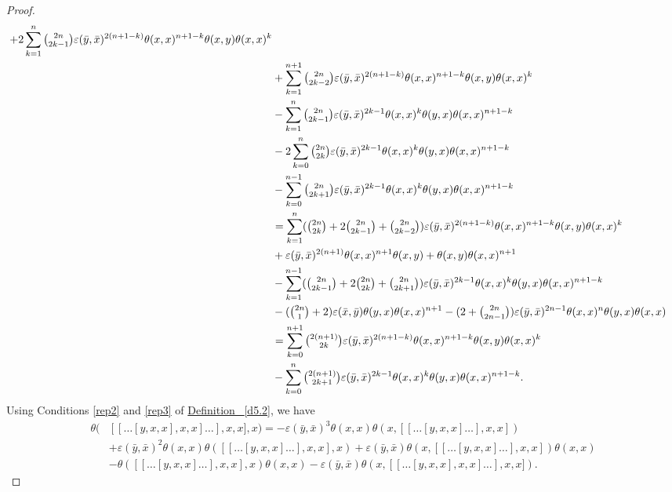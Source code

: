 \documentclass[11pt, twoside]{article}
\begin{document}
\begin{proof}
\begin{align*}
     + 2 \sum\limits_{k=1}^{n}\tbinom{2n}{2k-1}\varepsilon(\bar{y},\bar{x})^{2(n+1-k)}\theta(x,x)^{n+1-k}\theta(x,y)\theta(x,x)^{k} \\ & +\sum\limits_{k=1}^{n+1}\tbinom{2n}{2k-2}\varepsilon(\bar{y},\bar{x})^{2(n+1-k)}\theta(x,x)^{n+1-k}\theta(x,y)\theta(x,x)^{k} \\ & - \sum\limits_{k=1}^{n}\tbinom{2n}{2k-1}\varepsilon(\bar{y},\bar{x})^{2k-1}\theta(x,x)^{k}\theta(y,x)\theta(x,x)^{n+1-k} \\ & -2\sum\limits_{k=0}^n\tbinom{2n}{2k}\varepsilon(\bar{y},\bar{x})^{2k-1}\theta(x,x)^k\theta(y,x)\theta(x,x)^{n+1-k}\\ & -  \sum\limits_{k=0}^{n-1}\tbinom{2n}{2k+1}\varepsilon(\bar{y},\bar{x})^{2k-1}\theta(x,x)^k\theta(y,x)\theta(x,x)^{n+1-k} \\  & =  \sum\limits_{k=1}^{n}( \tbinom{2n}{2k}+2\tbinom{2n}{2k-1}+ \tbinom{2n}{2k-2})\varepsilon(\bar{y},\bar{x})^{2(n+1-k)}\theta(x,x)^{n+1-k}\theta(x,y)\theta(x,x)^{k} \\ &+\varepsilon(\bar{y},\bar{x})^{2(n+1)}\theta(x,x)^{n+1}\theta(x,y)+\theta(x,y)\theta(x,x)^{n+1} \\ &  - \sum\limits_{k=1}^{n-1}(\tbinom{2n}{2k-1} +2 \tbinom{2n}{2k} + \tbinom{2n}{2k+1})\varepsilon(\bar{y},\bar{x})^{2k-1}\theta(x,x)^{k}\theta(y,x)\theta(x,x)^{n+1-k} \\ &- (\tbinom{2n}{1}+2)\varepsilon(\bar{x},\bar{y})\theta(y,x)\theta(x,x)^{n+1} - (2+\tbinom{2n}{2n-1})\varepsilon(\bar{y},\bar{x})^{2n-1}\theta(x,x)^n\theta(y,x)\theta(x,x) \\  &= \sum\limits_{k=0}^{n+1}\tbinom{2(n+1)}{2k}\varepsilon(\bar{y},\bar{x})^{2(n+1-k)}\theta(x,x)^{n+1-k}\theta(x,y)\theta(x,x)^k \\ & - \sum\limits_{k=0}^{n}\tbinom{2(n+1)}{2k+1}\varepsilon(\bar{y},\bar{x})^{2k-1}\theta(x,x)^k\theta(y,x)\theta(x,x)^{n+1-k} . 
    \end{align*} 
    Using  Conditions \eqref{rep2} and \eqref{rep3} of  \hyperref[d5.2]{Definition ~\ref*{d5.2}}, we have \begin{align*}
        \theta(&[[\dots[y,x,x],x,x]\dots],x,x],x) = -\varepsilon(\bar{y},\bar{x})^3\theta(x,x)\theta(x,[[\dots[y,x,x]\dots],x,x]) \\ &+ \varepsilon(\bar{y},\bar{x})^2\theta(x,x)\theta([[\dots[y,x,x]\dots],x,x],x)+ \varepsilon(\bar{y},\bar{x})\theta(x,[[\dots[y,x,x]\dots],x,x])\theta(x,x) \\ & - \theta([[\dots[y,x,x]\dots],x,x],x)\theta(x,x) - \varepsilon(\bar{y},\bar{x})\theta(x,[[\dots[y,x,x],x,x]\dots],x,x]).

\end{align*}
\end{proof}
\end{document}
